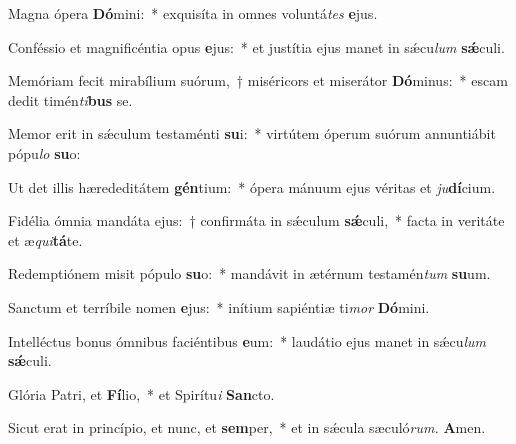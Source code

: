 \item Magna ópera \textbf{Dó}mini:~* exquisíta in omnes voluntá\hspace{0.03em}\textit{tes} \textbf{e}jus.
\item Conféssio et magnificéntia opus \textbf{e}jus:~* et justítia ejus manet in sǽcu\tinyhspace\textit{lum} \textbf{sǽ}culi.
\item Memóriam fecit mirabílium suórum,~† miséricors et miserátor \textbf{Dó}minus:~* escam dedit timén\textit{ti}\textbf{bus} se.
\item Memor erit in sǽculum testaménti \textbf{su}i:~* virtútem óperum suórum annuntiábit pópu\tinyhspace\textit{lo} \textbf{su}o:
\item Ut det illis hærededitátem \textbf{gén}tium:~* ópera mánuum ejus véritas et \textit{ju}\textbf{dí}cium.
\item Fidélia ómnia mandáta ejus:~† confirmáta in sǽculum \textbf{sǽ}culi,~* facta in veritáte et æ\tinyhspace\textit{qui}\textbf{tá}te.
\item Redemptiónem misit pópulo \textbf{su}o:~* mandávit in ætérnum testamén\tinyhspace\textit{tum} \textbf{su}um.
\item Sanctum et terríbile nomen \textbf{e}jus:~* inítium sapiéntiæ ti\textit{mor} \textbf{Dó}mini.
\item Intelléctus bonus ómnibus faciéntibus \textbf{e}um:~* laudátio ejus manet in sǽcu\tinyhspace\textit{lum} \textbf{sǽ}culi.
\item Glória Patri, et \textbf{Fí}lio,~* et Spirítu\textit{i} \textbf{San}cto.
\item Sicut erat in princípio, et nunc, et \textbf{sem}per,~* et in sǽcula sæculó\textit{rum.} \textbf{A}men.


